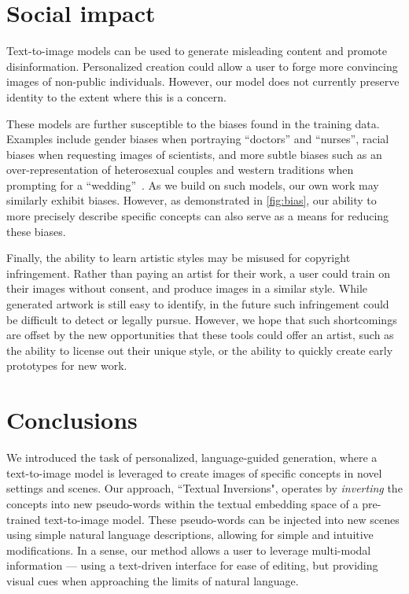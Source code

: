\section{Social impact} Text-to-image models can be used to generate misleading content and promote disinformation. Personalized creation could allow a user to forge more convincing images of non-public individuals. However, our model does not currently preserve identity to the extent where this is a concern.

These models are further susceptible to the biases found in the training data. Examples include gender biases when portraying ``doctors'' and ``nurses'', racial biases when requesting images of scientists, and more subtle biases such as an over-representation of heterosexual couples and western traditions when prompting for a ``wedding''~\citep{mishkin2022risks}. As we build on such models, our own work may similarly exhibit biases. However, as demonstrated in \ref{fig:bias}, our ability to more precisely describe specific concepts can also serve as a means for reducing these biases.

Finally, the ability to learn artistic styles may be misused for copyright infringement. Rather than paying an artist for their work, a user could train on their images without consent, and produce images in a similar style. While generated artwork is still easy to identify, in the future such infringement could be difficult to detect or legally pursue. However, we hope that such shortcomings are offset by the new opportunities that these tools could offer an artist, such as the ability to license out their unique style, or the ability to quickly create early prototypes for new work.

\section{Conclusions}
We introduced the task of personalized, language-guided generation, where a text-to-image model is leveraged to create images of specific concepts in novel settings and scenes. Our approach, ``Textual Inversions", operates by \textit{inverting} the concepts into new pseudo-words within the textual embedding space of a pre-trained text-to-image model. These pseudo-words can be injected into new scenes using simple natural language descriptions, allowing for simple and intuitive modifications. In a sense, our method allows a user to leverage multi-modal information --- using a text-driven interface for ease of editing, but providing visual cues when approaching the limits of natural language.

